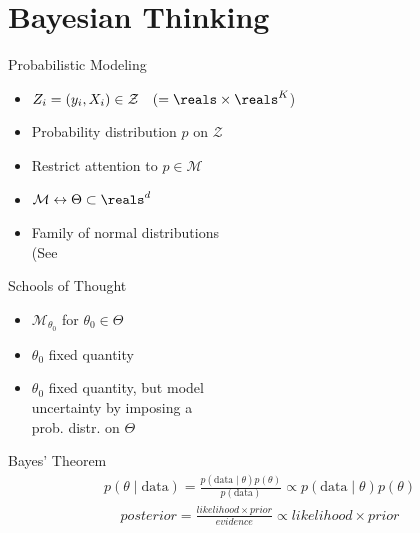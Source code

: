 \section{Bayesian Thinking}

\begin{frame}{Probabilistic Modeling}
  \Large{
  \begin{itemize}
    \item[]  $Z_i = (y_i, X_i) \in \mathcal{Z} \quad (=\reals \times \reals^K$)\pause
    \item[]  Probability distribution $p$ on $\mathcal{Z}$\pause
    \item[]  Restrict attention to $p \in \mathcal{M}$\pause
    \item[]  $\mathcal{M} \leftrightarrow \Theta \subset \reals^d$\pause
    \item[]  Family of normal distributions\pause\\
    \quad\quad\quad\quad (See \pause {}
  \end{itemize}
  }
\end{frame}

\begin{frame}{Schools of Thought}
  \Large{
  \begin{itemize}
    \item[]  $\mathcal{M}_{\theta_0}$ for $\theta_0 \in \Theta$\pause
    \item[]  $\theta_0$ fixed quantity\pause
    \item[]  $\theta_0$ fixed quantity\pause, but model\\
    \quad\quad\quad\quad uncertainty by imposing a\\
    \quad\quad\quad\quad prob. distr. on $\Theta$
  \end{itemize}
  }
\end{frame}

\begin{frame}{Bayes' Theorem}
  \Large{
    \begin{align*}
      p(\theta \mid \text{data}) = \frac{p(\text{data} \mid \theta) p(\theta)}{p(\text{data})} \propto p(\text{data} \mid \theta) p(\theta)
    \end{align*}\pause
    \vfill
    \begin{align*}
      posterior = \frac{likelihood \times prior}{evidence} \propto likelihood \times prior
    \end{align*}
  }
\end{frame}

